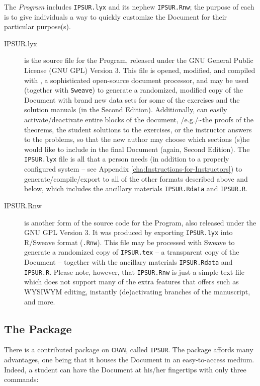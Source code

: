 \documentclass[captions=tableheading]{scrbook}
\begin{document}
The \emph{Program} includes \texttt{IPSUR.lyx} and its nephew \texttt{IPSUR.Rnw}; the purpose of each is to give individuals a way to quickly customize the Document for their particular purpose(s).


\begin{description}
\item[IPSUR.lyx] is the source \LyX{} file for the Program, released under the GNU General Public License (GNU GPL) Version 3. This file is opened, modified, and compiled with \LyX{}, a sophisticated open-source document processor, and may be used (together with \texttt{Sweave}) to generate a randomized, modified copy of the Document with brand new data sets for some of the exercises and the solution manuals (in the Second Edition). Additionally, \LyX{} can easily activate/deactivate entire blocks of the document, /e.g./\~{}the \textsf{proofs} of the theorems, the student \textsf{solutions} to the exercises, or the instructor \textsf{answers} to the problems, so that the new author may choose which sections (s)he would like to include in the final Document (again, Second Edition). The \texttt{IPSUR.lyx} file is all that a person needs (in addition to a properly configured system -- see Appendix \ref{cha:Instructions-for-Instructors}) to generate/compile/export to all of the other formats described above and below, which includes the ancillary materials \texttt{IPSUR.Rdata} and \texttt{IPSUR.R}.
\item[IPSUR.Rnw] is another form of the source code for the Program, also released under the GNU GPL Version 3. It was produced by exporting \texttt{IPSUR.lyx} into\textsf{ R}/Sweave format (\texttt{.Rnw}). This file may be processed with Sweave to generate a randomized copy of \texttt{IPSUR.tex} -- a transparent copy of the Document -- together with the ancillary materials \texttt{IPSUR.Rdata} and \texttt{IPSUR.R}. Please note, however, that \texttt{IPSUR.Rnw} is just a simple text file which does not support many of the extra features that \LyX{} offers such as WYSIWYM editing, instantly (de)activating branches of the manuscript, and more.
\end{description}



\subsection*{The Package}

There is a contributed package on \texttt{CRAN}, called \texttt{IPSUR}. The package affords many advantages, one being that it houses the  Document in an easy-to-access medium. Indeed, a student can have the Document at his/her fingertips with only three commands:
\end{document}
